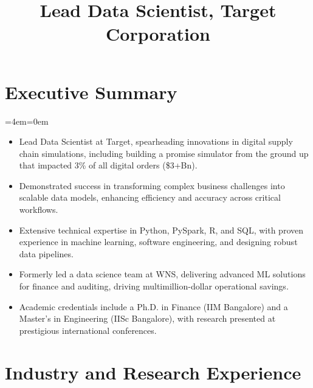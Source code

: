 \documentclass[11pt,a4paper,]{moderncv}
\title{Lead Data Scientist, Target Corporation}
\begin{document}
\makecvtitle

\newenvironment{smallblockquote}{
  \par
  \medskip
  \leftskip=2em\rightskip=0em
  \noindent\ignorespaces
  }{\par\medskip}

\newenvironment{blockquote}{
  \par
  \medskip
  \leftskip=4em\rightskip=0em
  \noindent\ignorespaces
  }{\par\medskip}

\hypertarget{executive-summary}{
\section{Executive Summary}\label{executive-summary}}

\begingroup
  \par
  \medskip
  \leftskip=4em\rightskip=0em
  \noindent\ignorespaces

\begin{itemize}
    \item Lead Data Scientist at Target, spearheading innovations in digital supply chain simulations, including building a promise simulator from the ground up that impacted 3\% of all digital orders (\$3+Bn).
    \item Demonstrated success in transforming complex business challenges into scalable data models, enhancing efficiency and accuracy across critical workflows.
    \item Extensive technical expertise in Python, PySpark, R, and SQL, with proven experience in machine learning, software engineering, and designing robust data pipelines.
    \item Formerly led a data science team at WNS, delivering advanced ML solutions for finance and auditing, driving multimillion-dollar operational savings.
    \item Academic credentials include a Ph.D. in Finance (IIM Bangalore) and a Master's in Engineering (IISc Bangalore), with research presented at prestigious international conferences.
\end{itemize}

  \par\medskip
\endgroup

\hypertarget{industry-and-research-experience}{
\section{Industry and Research
Experience}\label{industry-and-research-experience}}
\end{document}
